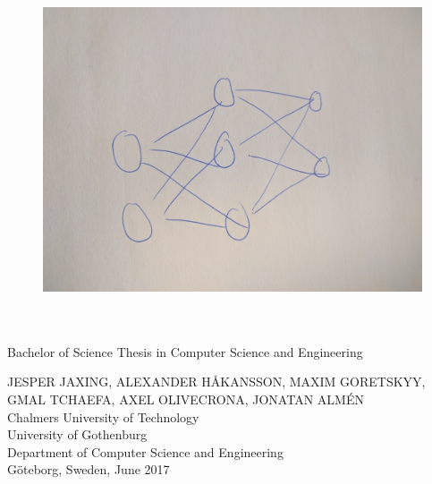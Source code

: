 
\begin{titlepage}
			
\addtolength{\voffset}{2cm}

\begin{figure}[H]
\centering
\vspace{1cm}	%
\includegraphics[width=0.9\linewidth]{figure/ann/ann}
\end{figure}

\mbox{}
\renewcommand{\familydefault}{\sfdefault} \normalfont %
\begin{flushleft}
\textbf{{\Huge \varthetitle}} 	\\[0.5cm]
{\LARGE \varthesubtitle}\\[0.2cm]
Bachelor of Science Thesis in Computer Science and Engineering \setlength{\parskip}{0.5cm}

{\large JESPER JAXING, ALEXANDER HÅKANSSON, MAXIM GORETSKYY, GMAL TCHAEFA, AXEL OLIVECRONA, JONATAN ALMÉN} \setlength{\parskip}{1.9cm}\\
\vfill
Chalmers University of Technology \\
University of Gothenburg \\
Department of Computer Science and Engineering \\
Göteborg, Sweden, June 2017

\end{flushleft}
\end{titlepage}

